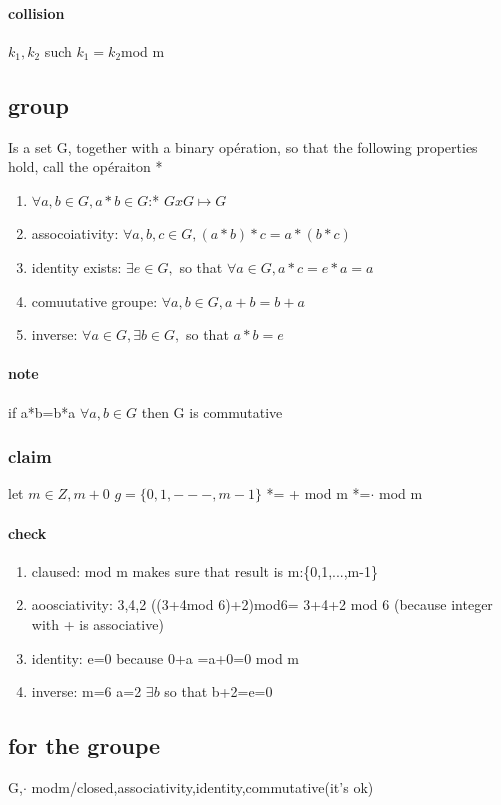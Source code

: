 \documentclass[a4paper,10pt]{article}
\begin{document}
{\paragraph{collision}
$k_1,k_2$ such $k_1=k_2$mod m
\subsection{group}
Is a set G, together with a binary opération, so that the following properties hold, call the opéraiton *
\begin{enumerate}
 \item $\forall a,b\in G, a*b\in G$:* $GxG\mapsto G$
 \item assocoiativity: $\forall a,b,c\in G,(a*b)*c=a*(b*c)$
 \item identity exists: $\exists e\in G,$ so that $\forall a\in G,a*c=e*a=a$
 \item comuutative groupe: $\forall a,b\in G,a+b=b+a$
 \item inverse: $\forall a\in G,\exists b\in G,$ so that $a*b=e$
\end{enumerate}
\paragraph{note}
if a*b=b*a $\forall a,b\in G$ then G is commutative
\subsubsection{claim}
let $m\in Z,m+0$
\newline
$g=\{0,1,---,m-1\}$
\newline
*= + mod m
\newline
*=$\cdot$ mod m 
\paragraph{check}
\begin{enumerate}
 \item claused: mod m makes sure that result is m:\{0,1,...,m-1\}
 \item aoosciativity: 3,4,2 ((3+4mod 6)+2)mod6= 3+4+2 mod 6 (because integer with + is associative)
 \item identity: e=0 because 0+a =a+0=0 mod m
 \item inverse: m=6 a=2 $\exists b$ so that b+2=e=0
\end{enumerate}
\subsection{for the groupe}
G,$\cdot$ modm/closed,associativity,identity,commutative(it's ok)
}
\end{document}
